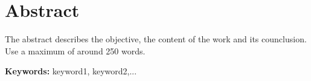 \chapter*{Abstract}


The abstract describes the objective, the content of the work and its counclusion. Use a maximum of around 250 words.

\vspace{1cm}

\textbf{\Large Keywords:} keyword1, keyword2,...

\cleardoublepage

